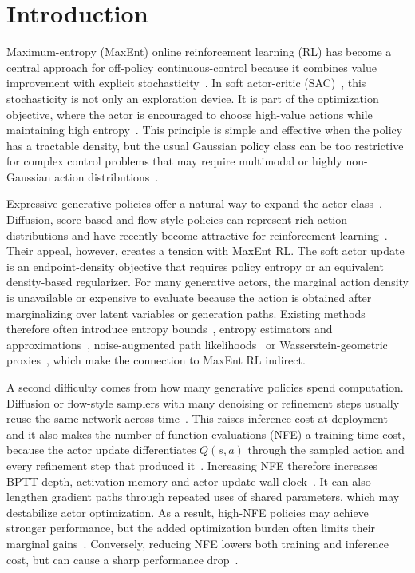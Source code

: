 \documentclass[11pt]{article}
\begin{document}
\availabilitybox

\section{Introduction}

Maximum-entropy (MaxEnt) online reinforcement learning (RL) has become a central approach for off-policy continuous-control because it combines value improvement with explicit stochasticity~\citep{levine2018reinforcement, oh2025discovering, haarnoja2018soft, SAC18}. In soft actor-critic (SAC)~\citep{SAC18}, this stochasticity is not only an exploration device. It is part of the optimization objective, where the actor is encouraged to choose high-value actions while maintaining high entropy~\cite{haarnoja2018soft}. This principle is simple and effective when the policy has a tractable density, but the usual Gaussian policy class can be too restrictive for complex control problems that may require multimodal or highly non-Gaussian action distributions~\cite{nauman2024bigger, NormalizingFlowRL24, DDiffPG24, FQL25}.

Expressive generative policies offer a natural way to expand the actor class~\cite{Diffusion20, ScoreDiff21, FlowMatching22,FPO25,DPPO25}. Diffusion, score-based and flow-style policies can represent rich action distributions and have recently become attractive for reinforcement learning~\citep{QSM24,QVPO24,D3P25,FlowRL25,ReinFlow25}. Their appeal, however, creates a tension with MaxEnt RL. The soft actor update is an endpoint-density objective that requires policy entropy or an equivalent density-based regularizer. For many generative actors, the marginal action density is unavailable or expensive to evaluate because the action is obtained after marginalizing over latent variables or generation paths. Existing methods therefore often introduce entropy bounds~\cite{DIME25}, entropy estimators and approximations~\cite{ACER24, QVPO24}, noise-augmented path likelihoods~\cite{SACFlow26} or Wasserstein-geometric proxies~\cite{FLAC26,WPPG26}, which make the connection to MaxEnt RL indirect.

A second difficulty comes from how many generative policies spend computation. Diffusion or flow-style samplers with many denoising or refinement steps usually reuse the same network across time~\cite{DPPO25,DIME25,QSM24,QVPO24}. This raises inference cost at deployment and it also makes the number of function evaluations (NFE) a training-time cost, because the actor update differentiates $Q(s,a)$ through the sampled action and every refinement step that produced it~\cite{OFQL26}. Increasing NFE therefore increases BPTT depth, activation memory and actor-update wall-clock~\cite{fransone}. It can also lengthen gradient paths through repeated uses of shared parameters, which may destabilize actor optimization. As a result, high-NFE policies may achieve stronger performance, but the added optimization burden often limits their marginal gains~\cite{QVPO24}. Conversely, reducing NFE lowers both training and inference cost, but can cause a sharp performance drop~\cite{FQL25,DIME25}.
\end{document}
